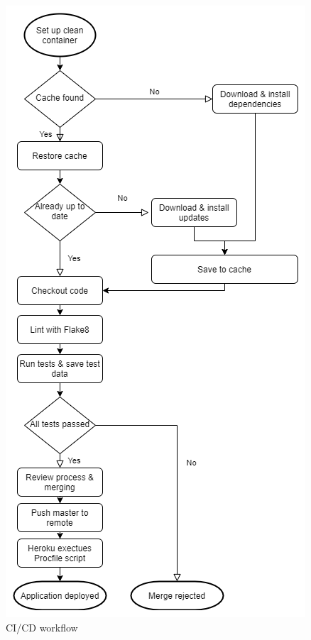  \begin{figure}[H]
   \centering
   \includegraphics[scale=0.6]{06Coding/05Pictures/CI_CD.png}
   \caption{CI/CD workflow}
   \label{CI_CD}
\end{figure}

